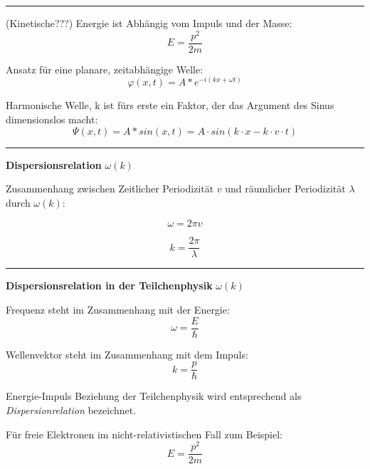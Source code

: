 \documentclass{article}
\begin{document}
\hrule
\vspace{0.5cm}

(Kinetische???) Energie ist Abhängig vom Impuls und der Masse:
\begin{equation}
    E = \frac{p^2}{2m}
\end{equation}

Ansatz für eine planare, zeitabhängige Welle:
\begin{equation}
    \varphi(x,t) = A * e^{-i(kx+\omega t)}
\end{equation}

Harmonische Welle, k ist fürs erste ein Faktor, der das Argument des Sinus dimensionslos macht:
\begin{equation}
    \Psi(x,t) = A * sin(x,t) = A \cdot sin(k\cdot x - k \cdot v \cdot t)
\end{equation}

\hrule
\vspace{0.5cm}

\textbf{Dispersionsrelation} $\omega(k)$

Zusammenhang zwischen Zeitlicher Periodizität $v$ und räumlicher Periodizität $\lambda$ durch $\omega(k)$:

\begin{equation}
    \omega = 2\pi v
\end{equation}

\begin{equation}
    k = \frac{2\pi}{\lambda}
\end{equation}
\hrule
\vspace{0.5cm}

\textbf{Dispersionsrelation in der Teilchenphysik} $\omega(k)$

Frequenz steht im Zusammenhang mit der Energie:
\begin{equation}
    \omega = \frac{E}{\hbar}
\end{equation}

Wellenvektor steht im Zusammenhang mit dem Impuls:
\begin{equation}
    k = \frac{p}{\hbar}
\end{equation}

Energie-Impuls Beziehung der Teilchenphysik wird entsprechend als \textit{Dispersionrelation} bezeichnet.

Für freie Elektronen im nicht-relativistischen Fall zum Beispiel:
\begin{equation}
    E = \frac{p^2}{2m}
\end{equation}
\end{document}
